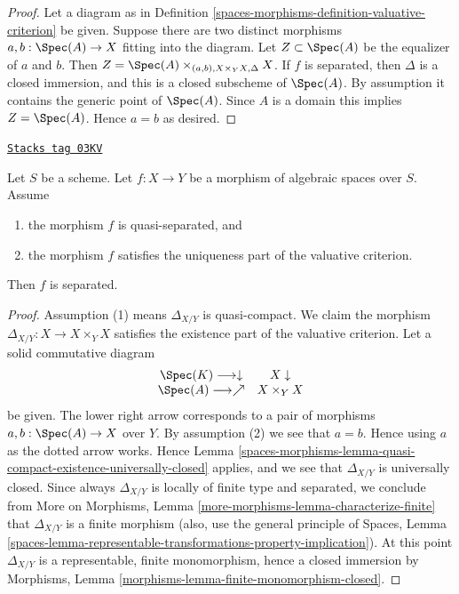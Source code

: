\begin{proof}
Let a diagram as in Definition \ref{spaces-morphisms-definition-valuative-criterion}
be given. Suppose there are two distinct morphisms
$a, b : \Spec(A) \to X$ fitting into the diagram.
Let $Z \subset \Spec(A)$ be the equalizer of $a$ and $b$.
Then $Z = \Spec(A) \times_{(a, b), X \times_Y X, \Delta} X$.
If $f$ is separated, then $\Delta$ is a closed immersion, and
this is a closed subscheme of $\Spec(A)$. By assumption it contains
the generic point of $\Spec(A)$. Since $A$ is a domain
this implies $Z = \Spec(A)$. Hence $a = b$ as desired.
\end{proof}

\begin{lemma}

\label{spaces-morphisms-lemma-valuative-criterion-separatedness}
\href{https://stacks.math.columbia.edu/tag/03KV}{\texttt{Stacks tag 03KV}}

Let $S$ be a scheme.
Let $f : X \to Y$ be a morphism of algebraic spaces over $S$.
Assume
\begin{enumerate}
\item the morphism $f$ is quasi-separated, and
\item the morphism $f$ satisfies the uniqueness
part of the valuative criterion.
\end{enumerate}
Then $f$ is separated.
\end{lemma}

\begin{proof}
Assumption (1) means $\Delta_{X/Y}$ is quasi-compact.
We claim the morphism
$\Delta_{X/Y} : X \to X \times_Y X$ satisfies the existence
part of the valuative criterion.
Let a solid commutative diagram
$$
\begin{array}{cc}\Spec(K) \longrightarrow\downarrow & X \downarrow \\ \Spec(A) \longrightarrow\nearrow & X \times_Y X\end{array}
$$
be given. The lower right arrow corresponds to a
pair of morphisms $a, b : \Spec(A) \to X$ over $Y$.
By assumption (2) we see that $a = b$. Hence using $a$ as the dotted
arrow works. Hence
Lemma \ref{spaces-morphisms-lemma-quasi-compact-existence-universally-closed}
applies, and we see that $\Delta_{X/Y}$ is universally closed.
Since always $\Delta_{X/Y}$ is locally of finite type and
separated, we conclude from
More on Morphisms, Lemma \ref{more-morphisms-lemma-characterize-finite}
that $\Delta_{X/Y}$ is a finite morphism (also, use the
general principle of
Spaces, Lemma
\ref{spaces-lemma-representable-transformations-property-implication}).
At this point $\Delta_{X/Y}$ is a representable, finite monomorphism,
hence a closed immersion by
Morphisms, Lemma \ref{morphisms-lemma-finite-monomorphism-closed}.
\end{proof}

